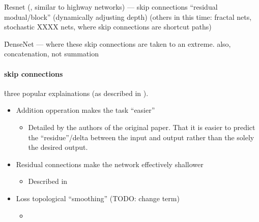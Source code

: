 


\r{Resnet (, similar to highway networks) --- skip connections ``residual modual/block'' (dynamically adjusting depth) (others in this time: fractal nets, stochastic XXXX nets, where skip connections are shortcut paths)}

\r{DenseNet --- where these skip connections are taken to an extreme. also, concatenation, not summation}

\paragraph{skip connections}


\r{three popular explainations (as described in \cite{lakshmanan2021practical}).}
\begin{itemize}[noitemsep,topsep=0pt]
	\item Addition opperation makes the task ``easier''
	\begin{itemize}[noitemsep,topsep=0pt]
		\item Detailed by the authors of the original paper. That it is easier to predict the ``residue''/delta between the input and output rather than the solely the desired output.
	\end{itemize}
	\item Residual connections make the network effectively shallower 
	\begin{itemize}[noitemsep,topsep=0pt]
		\item Described in 
	\end{itemize}
	\item Loss topological ``smoothing'' (TODO: change term)
	\begin{itemize}[noitemsep,topsep=0pt]
		\item {}
	\end{itemize}
\end{itemize}



